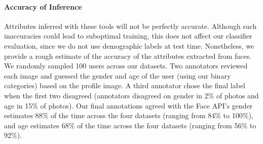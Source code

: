 \paragraph{Accuracy of Inference}
Attributes inferred with these tools will not be perfectly accurate. 
Although such inaccuracies could lead to suboptimal training,
this does not affect our classifier evaluation,
since we do not use demographic labels at test time.
Nonetheless, we provide a rough estimate of the accuracy of the attributes extracted from faces.
We randomly sampled 100 users across our datasets.
Two annotators reviewed each image and guessed the gender and age of the user (using our binary categories) based on the profile image.
A third annotator chose the final label when the first two disagreed (annotators disagreed on gender in 2\% of photos and age in 15\% of photos).
Our final annotations agreed with the Face API's gender estimates 88\% of the time across the four datasets (ranging from 84\% to 100\%),
and age estimates 68\% of the time across the four datasets (ranging from 56\% to 92\%).


\begin{table}[t]
\centering
{}
\caption{Dataset statistics including user demographic distributions for four user factors.}
\label{chap4:tab:demographic}
\end{table}

